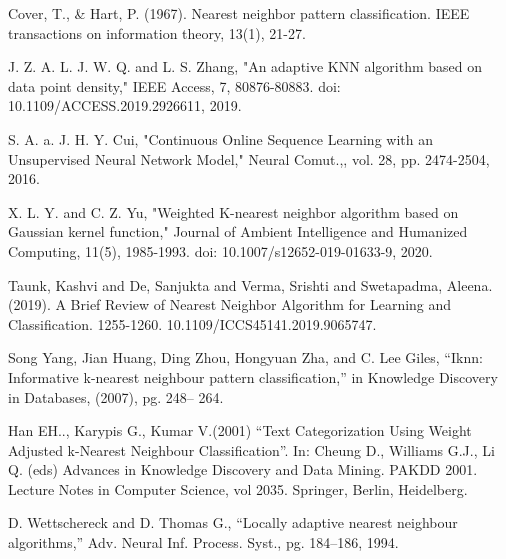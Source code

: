 \documentclass[conference]{IEEEtran}
\begin{document}
%
%
%
\begin{thebibliography}{1}

Cover, T., \& Hart, P. (1967). Nearest neighbor pattern classification. IEEE transactions on information theory, 13(1), 21-27.

J. Z. A. L. J. W. Q. and L. S. Zhang, "An adaptive KNN algorithm based on data point density," IEEE Access, 7, 80876-80883. doi: 10.1109/ACCESS.2019.2926611, 2019.


S. A. a. J. H. Y. Cui, "Continuous Online Sequence Learning with an Unsupervised Neural Network Model," Neural Comut.,, vol. 28, pp. 2474-2504, 2016.






X. L. Y. and C. Z. Yu, "Weighted K-nearest neighbor algorithm based on Gaussian kernel function," Journal of Ambient Intelligence and Humanized Computing, 11(5), 1985-1993. doi: 10.1007/s12652-019-01633-9, 2020.

Taunk, Kashvi and De, Sanjukta and Verma, Srishti and Swetapadma, Aleena. (2019). A Brief Review of Nearest Neighbor Algorithm for Learning and Classification. 1255-1260. 10.1109/ICCS45141.2019.9065747. 


Song Yang, Jian Huang, Ding Zhou, Hongyuan Zha, and C. Lee Giles, “Iknn:
Informative k-nearest neighbour pattern classification,” in Knowledge Discovery in Databases, (2007), pg. 248– 264.


Han EH.., Karypis G., Kumar V.(2001) “Text Categorization Using Weight Adjusted k-Nearest Neighbour Classification”. In: Cheung D., Williams G.J., Li Q. (eds) Advances in Knowledge Discovery and Data Mining. PAKDD 2001. Lecture Notes in Computer Science, vol 2035. Springer, Berlin, Heidelberg.



D. Wettschereck and D. Thomas G., “Locally adaptive nearest neighbour algorithms,” Adv. Neural Inf. Process. Syst., pg. 184–186, 1994.





\end{thebibliography}




\end{document}
